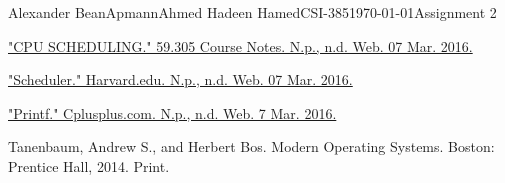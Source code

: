 \documentclass[12pt,letterpaper]{article}
\begin{document}
\begin{mla}{Alexander Bean}{Apmann}{Ahmed Hadeen Hamed}{CSI-385}{\today}{Assignment 2}
\begin{workscited}

\bibent
\href{http://www.massey.ac.nz/~mjjohnso/notes/59305/mod5.html}{"CPU SCHEDULING." 59.305 Course Notes. N.p., n.d. Web. 07 Mar. 2016.}

\bibent
\href{http://www.read.seas.harvard.edu/~kohler/class/05s-osp/notes/notes5.html}{"Scheduler." Harvard.edu. N.p., n.d. Web. 07 Mar. 2016.}

\bibent
\href{http://www.cplusplus.com/reference/cstdio/printf/}{"Printf." Cplusplus.com. N.p., n.d. Web. 7 Mar. 2016.}

\bibent
Tanenbaum, Andrew S., and Herbert Bos. Modern Operating Systems. Boston: Prentice Hall, 2014. Print.

\end{workscited}

\end{mla}
\end{document}
